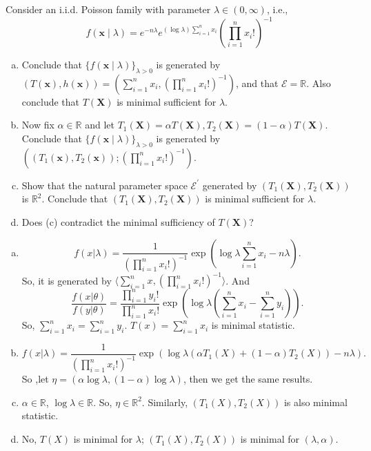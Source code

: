 \begin{ex}
    Consider an i.i.d. Poisson family with parameter \(\lambda \in(0, \infty)\), i.e.,
    \[
        f(\mathbf{x} \mid \lambda)=e^{-n \lambda} e^{(\log \lambda) \sum_{i=1}^{n} x_{i}}\left(\prod_{i=1}^{n} x_{i} !\right)^{-1}
    \]
    \begin{enumerate}[(a)]
        \item Conclude that \(\{f(\mathbf{x} \mid \lambda)\}_{\lambda>0}\) is generated by \((T(\mathbf{x}), h(\mathbf{x}))=\left(\sum_{i=1}^{n} x_{i},\left(\prod_{i=1}^{n} x_{i} !\right)^{-1}\right)\), and that \(\mathcal{E}=\mathbb{R}\). Also conclude that \(T(\mathbf{X})\) is minimal sufficient for \(\lambda\). 
        \item Now fix \(\alpha \in \mathbb{R}\) and let \(T_{1}(\mathbf{X})=\alpha T(\mathbf{X}), T_{2}(\mathbf{X})=(1-\alpha) T(\mathbf{X})\). Conclude that \(\{f(\mathbf{x} \mid \lambda)\}_{\lambda>0}\) is generated by \(\left(\left(T_{1}(\mathbf{x}), T_{2}(\mathbf{x})\right) ;\left(\prod_{i=1}^{n} x_{i} !\right)^{-1}\right)\). 
        \item Show that the natural parameter space \(\mathcal{E}^{\prime}\) generated by \(\left(T_{1}(\mathbf{X}), T_{2}(\mathbf{X})\right)\) is \(\mathbb{R}^{2}\). Conclude that \(\left(T_{1}(\mathbf{X}), T_{2}(\mathbf{X})\right)\) is minimal sufficient for \(\lambda\). 
        \item Does (c) contradict the minimal sufficiency of \(T(\mathbf{X})\)? 
    \end{enumerate}
\end{ex}

\begin{solution}
    \begin{enumerate}[(a)]
        \item \[
                f(x|\lambda)=\frac{1}{(\prod_{i=1}^nx_i!)^{-1}}\exp\left(\log{\lambda} \sum_{i=1}^nx_i-n\lambda\right). 
            \]
            So, it is generated by $\langle \sum_{i=1}^nx, (\prod_{i=1}^nx_i!)^{-1} \rangle$. And 
            \[
                \frac{f(x|\theta)}{f(y|\theta)} = \frac{\prod_{i=1}^ny_i!}{\prod_{i=1}^nx_i!}\exp\left(\log\lambda\left(\sum_{i=1}^n x_i-\sum_{i=1}^n y_i\right)\right). 
            \]
            So, $\sum_{i=1}^n x_i=\sum_{i=1}^n y_i$. $T(x)=\sum_{i=1}^n x_i$ is minimal statistic. 
        \item \[
            f(x|\lambda)=\frac{1}{(\prod_{i=1}^nx_i!)^{-1}}\exp\left(\log{\lambda} (\alpha T_1(X)+(1-\alpha)T_2(X)) - n\lambda\right). 
        \]
        So ,let $\eta=(\alpha\log\lambda, (1-\alpha)\log\lambda)$, then we get the same results. 
        \item $\alpha\in\mathbb{R}$, $\log\lambda\in\mathbb{R}$. So, $\eta\in\mathbb{R}^2$. Similarly, $(T_1(X),T_2(X))$ is also minimal statistic. 
        \item No, $T(X)$ is minimal for $\lambda$; $(T_1(X), T_2(X))$ is minimal for $(\lambda, \alpha)$. 
    \end{enumerate}
    
\end{solution}
